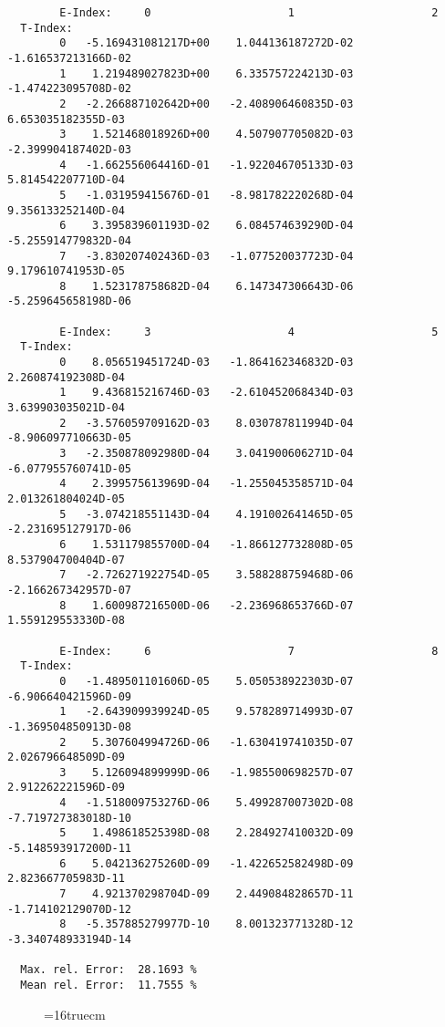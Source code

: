 \documentclass[12pt]{article}
\begin{document}
\begin{small}\begin{verbatim}
        E-Index:     0                     1                     2
  T-Index:
        0   -5.169431081217D+00    1.044136187272D-02   -1.616537213166D-02
        1    1.219489027823D+00    6.335757224213D-03   -1.474223095708D-02
        2   -2.266887102642D+00   -2.408906460835D-03    6.653035182355D-03
        3    1.521468018926D+00    4.507907705082D-03   -2.399904187402D-03
        4   -1.662556064416D-01   -1.922046705133D-03    5.814542207710D-04
        5   -1.031959415676D-01   -8.981782220268D-04    9.356133252140D-04
        6    3.395839601193D-02    6.084574639290D-04   -5.255914779832D-04
        7   -3.830207402436D-03   -1.077520037723D-04    9.179610741953D-05
        8    1.523178758682D-04    6.147347306643D-06   -5.259645658198D-06

        E-Index:     3                     4                     5
  T-Index:
        0    8.056519451724D-03   -1.864162346832D-03    2.260874192308D-04
        1    9.436815216746D-03   -2.610452068434D-03    3.639903035021D-04
        2   -3.576059709162D-03    8.030787811994D-04   -8.906097710663D-05
        3   -2.350878092980D-04    3.041900606271D-04   -6.077955760741D-05
        4    2.399575613969D-04   -1.255045358571D-04    2.013261804024D-05
        5   -3.074218551143D-04    4.191002641465D-05   -2.231695127917D-06
        6    1.531179855700D-04   -1.866127732808D-05    8.537904700404D-07
        7   -2.726271922754D-05    3.588288759468D-06   -2.166267342957D-07
        8    1.600987216500D-06   -2.236968653766D-07    1.559129553330D-08

        E-Index:     6                     7                     8
  T-Index:
        0   -1.489501101606D-05    5.050538922303D-07   -6.906640421596D-09
        1   -2.643909939924D-05    9.578289714993D-07   -1.369504850913D-08
        2    5.307604994726D-06   -1.630419741035D-07    2.026796648509D-09
        3    5.126094899999D-06   -1.985500698257D-07    2.912262221596D-09
        4   -1.518009753276D-06    5.499287007302D-08   -7.719727383018D-10
        5    1.498618525398D-08    2.284927410032D-09   -5.148593917200D-11
        6    5.042136275260D-09   -1.422652582498D-09    2.823667705983D-11
        7    4.921370298704D-09    2.449084828657D-11   -1.714102129070D-12
        8   -5.357885279977D-10    8.001323771328D-12   -3.340748933194D-14

  Max. rel. Error:  28.1693 %
  Mean rel. Error:  11.7555 %
\end{verbatim}\end{small}
\begin{figure} \label{2.0c}
\epsfxsize=16truecm
\end{figure}
\newpage
\end{document}
